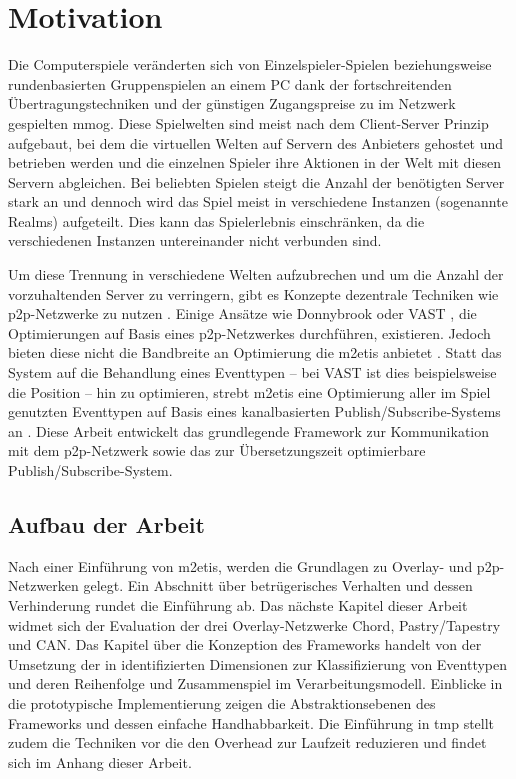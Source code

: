 \chapter{Motivation}
\label{chap:einleitung}
Die Computerspiele veränderten sich von Einzelspieler-Spielen beziehungsweise rundenbasierten Gruppenspielen an einem PC dank der fortschreitenden Übertragungs\-techniken und der günstigen Zugangspreise zu im Netzwerk gespielten \ac{mmog}. Diese Spielwelten sind meist nach dem Client-Server Prinzip aufgebaut, bei dem die virtuellen Welten auf Servern des Anbieters gehostet und betrieben werden und die einzelnen Spieler ihre Aktionen in der Welt mit diesen Servern abgleichen. Bei beliebten Spielen steigt die Anzahl der benötigten Server stark an und dennoch wird das Spiel meist in verschiedene Instanzen (sogenannte Realms) aufgeteilt. Dies kann das Spielerlebnis einschränken, da die verschiedenen Instanzen untereinander nicht verbunden sind.

Um diese Trennung in verschiedene Welten aufzubrechen und um die Anzahl der vorzuhaltenden Server zu verringern, gibt es Konzepte dezentrale Techniken wie \ac{p2p}-Netzwerke zu nutzen \cite{Knutsson2004Peertopeer, Triebel2008Peertopeer}. Einige Ansätze wie Donnybrook \cite{Bharambe2008Donnybrook} oder VAST \cite{Backhaus2007Voronoibased}, die Optimierungen auf Basis eines \ac{p2p}-Netzwerkes durchführen, existieren. Jedoch bieten diese nicht die Bandbreite an Optimierung die \ac{m2etis} anbietet \cite{Fischer2010Event}. Statt das System auf die Behandlung eines Eventtypen -- bei VAST ist dies beispielsweise die Position -- hin zu optimieren, strebt \ac{m2etis} eine Optimierung aller im Spiel genutzten Eventtypen auf Basis eines kanalbasierten Publish/Subscribe-Systems an \cite{Fischer2010a}. Diese Arbeit entwickelt das grundlegende Framework zur Kommunikation mit dem \ac{p2p}-Netzwerk sowie das zur Übersetzungszeit optimierbare Publish/Subscribe-System.

\section*{Aufbau der Arbeit}
Nach einer Einführung von \ac{m2etis}, werden die Grundlagen zu Overlay- und p2p-Netzwerken gelegt. Ein Abschnitt über betrügerisches Verhalten und dessen Verhinderung rundet die Einführung ab. Das nächste Kapitel dieser Arbeit widmet sich der Evaluation der drei Overlay-Netzwerke Chord, Pastry/Tapestry und CAN. Das Kapitel über die Konzeption des Frameworks handelt von der Umsetzung der in \cite{Fischer2010Event} identifizierten Dimensionen zur Klassifizierung von Eventtypen und deren Reihenfolge und Zusammenspiel im Verarbeitungsmodell. Einblicke in die prototypische Implementierung zeigen die Abstraktionsebenen des Frameworks und dessen einfache Handhabbarkeit. Die Einführung in \ac{tmp} stellt zudem die Techniken vor die den Overhead zur Laufzeit reduzieren und findet sich im Anhang dieser Arbeit.
